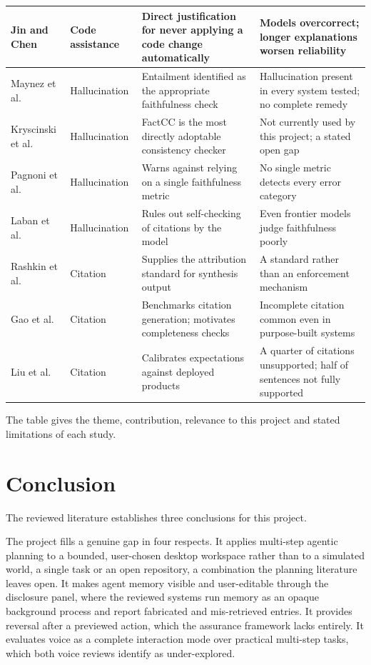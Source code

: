 \documentclass{FastFyp}
\begin{document}
{\begin{longtable}{|p{2.6cm}|p{2.0cm}|p{3.6cm}|p{4.6cm}|}
\hline
Jin and Chen \cite{ref:jin2026} & Code assistance & Direct justification for never applying a code change automatically & Models overcorrect; longer explanations worsen reliability \\
\hline
Maynez et al. \cite{ref:maynez2020} & Hallucination & Entailment identified as the appropriate faithfulness check & Hallucination present in every system tested; no complete remedy \\
\hline
Kryscinski et al. \cite{ref:kryscinski2020} & Hallucination & FactCC is the most directly adoptable consistency checker & Not currently used by this project; a stated open gap \\
\hline
Pagnoni et al. \cite{ref:pagnoni2021} & Hallucination & Warns against relying on a single faithfulness metric & No single metric detects every error category \\
\hline
Laban et al. \cite{ref:laban2023} & Hallucination & Rules out self-checking of citations by the model & Even frontier models judge faithfulness poorly \\
\hline
Rashkin et al. \cite{ref:rashkin2023} & Citation & Supplies the attribution standard for synthesis output & A standard rather than an enforcement mechanism \\
\hline
Gao et al. \cite{ref:gao2023} & Citation & Benchmarks citation generation; motivates completeness checks & Incomplete citation common even in purpose-built systems \\
\hline
Liu et al. \cite{ref:liu2023} & Citation & Calibrates expectations against deployed products & A quarter of citations unsupported; half of sentences not fully supported \\
\hline
\end{longtable}
}

The table gives the theme, contribution, relevance to this project and stated limitations of each study.

\section{Conclusion}
The reviewed literature establishes three conclusions for this project.

The project fills a genuine gap in four respects. It applies multi-step agentic planning to a bounded, user-chosen desktop workspace rather than to a simulated world, a single task or an open repository, a combination the planning literature leaves open. It makes agent memory visible and user-editable through the disclosure panel, where the reviewed systems run memory as an opaque background process and report fabricated and mis-retrieved entries. It provides reversal after a previewed action, which the assurance framework lacks entirely. It evaluates voice as a complete interaction mode over practical multi-step tasks, which both voice reviews identify as under-explored.
\end{document}
